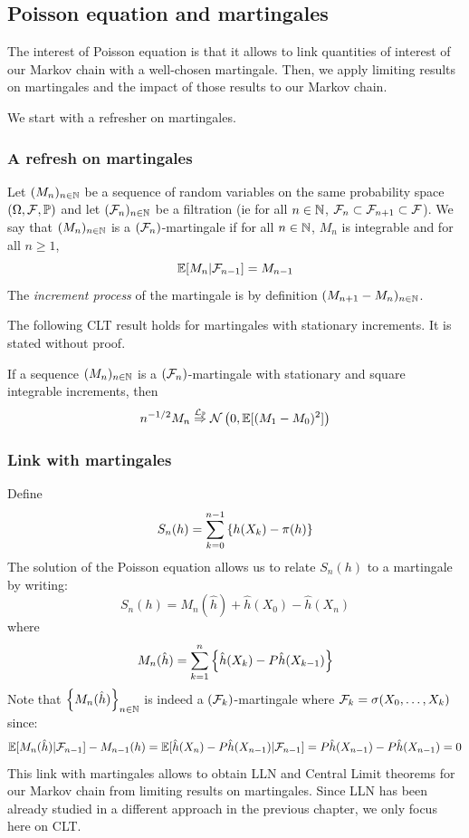 \documentclass[english,graybox,envcountchap,envcountsame,sectrefs,shortlabels]{svmono}
\theoremstyle{style}
\newcommand{\dlim}[1]{\stackrel{\mathcal{L}_{#1}}{\Rightarrow}}
\newcommand{\gauss}{\mathcal{N}}
\begin{document}
\subsection{Poisson equation and martingales}

The interest of Poisson equation is that it allows to link quantities of interest of our Markov chain with a well-chosen martingale. Then, we apply limiting results on martingales and the impact of those results to our Markov chain.

We start with a refresher on martingales.

\subsubsection{A refresh on martingales}
Let $(M_n)_{n \in \mathbb{N}}$ be a sequence of random variables on the same probability space $(\Omega,\mathcal{F},\mathbb{P})$ and let $(\mathcal{F}_n)_{n\in\mathbb{N}}$ be a filtration (ie for all $n\in\mathbb{N}$, $\mathcal{F}_n\subset \mathcal{F}_{n+1}\subset \mathcal{F}$). We say that $(M_n)_{n \in \mathbb{N}}$ is a {\rm $(\mathcal{F}_n)$-martingale} if for all $n\in\mathbb{N}$, $M_n$ is integrable and for all $n\geq 1$,
$$
\mathbb{E}[M_n|\mathcal{F}_{n-1}]=M_{n-1}
$$
The {\em increment process} of the martingale is by definition $(M_{n+1}-M_n)_{n\in\mathbb{N}}$.

The following CLT result holds for martingales with stationary increments. It is stated without proof.
\begin{framed}
\begin{theorem} \label{thm:clt:marting} 
If a sequence $(M_n)_{n \in \mathbb{N}}$ is a $(\mathcal{F}_n)$-martingale with stationary and square integrable increments, then
$$
  n^{-1/2} M_n \dlim{\PP} \gauss\lr{0,\PE[(M_1-M_0)^2]}
$$
\end{theorem}

\end{framed}

\subsubsection{Link with martingales}

Define
$$
S_n(h)=\sum_{k=0}^{n-1} \left\{ h(X_k)-\pi(h)\right\}
$$
The solution of the Poisson equation allows us to relate $S_n(h)$ to a martingale by writing:
\begin{equation}\label{eq:decomp:marting}
S_n(h)=M_n(\hat h)+\hat h(X_0)-\hat h(X_n)
\end{equation}
where
\begin{equation}\label{eq:def:marting}
M_n(\hat h)=\sum_{k=1}^n \left\{ \hat h(X_k)-P\hat h(X_{k-1})\right\}
\end{equation}
Note that $\left\{ M_n(\hat h)\right\}_{n\in\mathbb{N}}$ is indeed a $(\mathcal{F}_k)$-martingale where $\mathcal{F}_k=\sigma(X_0,\ldots,X_k)$ since:
$$
\mathbb{E}[M_n(\hat h)|\mathcal{F}_{n-1}]-M_{n-1}(h)=\mathbb{E}[\hat h(X_n)-P\hat h(X_{n-1})|\mathcal{F}_{n-1}]=P\hat h(X_{n-1})-P\hat h(X_{n-1})=0
$$
This link with martingales allows to obtain LLN and Central Limit theorems for our Markov chain from limiting results on martingales. Since LLN has been already studied in a different approach in the previous chapter, we only focus here on CLT.
\end{document}
